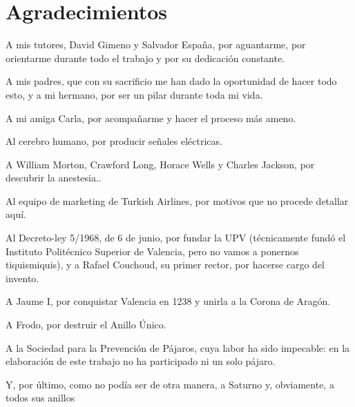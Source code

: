 %     

\chapter*{Agradecimientos}
\begingroup

A mis tutores, David Gimeno y Salvador España, por aguantarme, por orientarme durante todo
el trabajo y por su dedicación constante.

A mis padres, que con su sacrificio me han dado la oportunidad de hacer todo esto, y a mi
hermano, por ser un pilar durante toda mi vida.

A mi amiga Carla, por acompañarme y hacer el proceso más ameno.



Al cerebro humano, por producir señales eléctricas.

A William Morton, Crawford Long, Horace Wells y Charles Jackson, por descubrir la anestesia..

Al equipo de marketing de Turkish Airlines, por motivos que no procede detallar aquí.

Al Decreto-ley 5/1968, de 6 de junio, por fundar la UPV (técnicamente fundó el Instituto
Politécnico Superior de Valencia, pero no vamos a ponernos tiquismiquis), y a Rafael Couchoud,
su primer rector, por hacerse cargo del invento.

A Jaume I, por conquistar Valencia en 1238 y unirla a la Corona de Aragón.

A Frodo, por destruir el Anillo Único.

A la Sociedad para la Prevención de Pájaros, cuya labor ha sido impecable: en la elaboración
de este trabajo no ha participado ni un solo pájaro.

Y, por último, como no podía ser de otra manera, a Saturno y, obviamente, a todos sus anillos
\endgroup
\cleardoublepage
